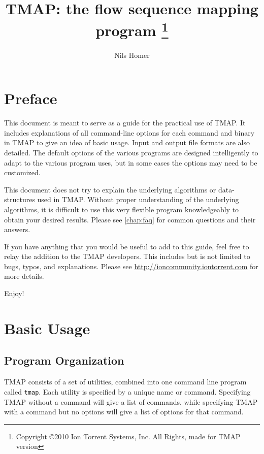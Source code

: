 \documentclass[a4paper,12pt]{book}
\author{Nils Homer}
\date{}
\title{TMAP: the flow sequence mapping program
\thanks{Copyright \copyright 2010 Ion Torrent Systems, Inc. All Rights, made for TMAP version \Version}
}
\newcommand{\TT}[1]{{\tt #1}} %
\begin{document}
\frontmatter

\maketitle

\tableofcontents
{}


\chapter{Preface}
This document is meant to serve as a guide for the practical use of TMAP.
It includes explanations of all command-line options for each command and binary in TMAP to give an idea of basic usage.
Input and output file formats are also detailed.
The default options of the various programs are designed intelligently to adapt to the various program uses, but in some cases the options may need to be customized.

This document does not try to explain the underlying algorithms or data-structures used in TMAP.
Without proper understanding of the underlying algorithms, it is difficult to use this very flexible program knowledgeably to obtain your desired results.
Please see \autoref{chap:faq} for common questions and their answers.

If you have anything that you would be useful to add to this guide, feel free to relay the addition to the TMAP developers.
This includes but is not limited to bugs, typos, and explanations.
Please see \url{http://ioncommunity.iontorrent.com} for more details.

Enjoy!

\mainmatter

\chapter{Basic Usage}

\section{Program Organization}
TMAP consists of a set of utilities, combined into one command line program called \TT{tmap}.  
Each utility is specified by a unique name or command.
Specifying TMAP without a command will give a list of commands, while specifying TMAP with a command but no options will give a list of options for that command.
\end{document}
